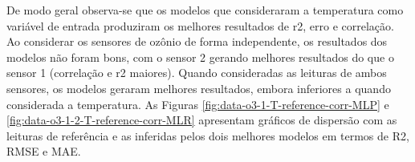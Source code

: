 De modo geral observa-se que os modelos que consideraram a temperatura como variável de entrada produziram os melhores resultados de r2, erro e correlação. Ao considerar os sensores de ozônio de forma independente, os resultados dos modelos não foram bons, com o sensor 2 gerando melhores resultados do que o sensor 1 (correlação e r2 maiores). Quando consideradas as leituras de ambos sensores, os modelos geraram melhores resultados, embora inferiores a quando considerada a temperatura. As Figuras \ref{fig:data-o3-1-T-reference-corr-MLP} e \ref{fig:data-o3-1-2-T-reference-corr-MLR} apresentam gráficos de dispersão com as leituras de referência e as inferidas pelos dois melhores modelos em termos de R2, RMSE e MAE.